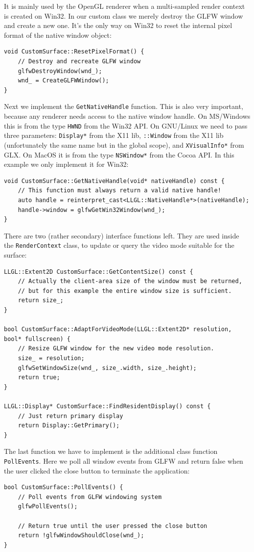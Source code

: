 \documentclass{article}
\begin{document}
It is mainly used by the OpenGL renderer when a multi-sampled render context is created on Win32.
In our custom class we merely destroy the GLFW window and create a new one.
It's the only way on Win32 to reset the internal pixel format of the native window object:
\begin{lstlisting}
void CustomSurface::ResetPixelFormat() {
	// Destroy and recreate GLFW window
	glfwDestroyWindow(wnd_);
	wnd_ = CreateGLFWWindow();
}
\end{lstlisting}
Next we implement the \texttt{GetNativeHandle} function. This is also very important,
because any renderer needs access to the native window handle.
On MS/Windows this is from the type \texttt{HWND} from the Win32 API.
On GNU/Linux we need to pass three parameters: \texttt{Display*} from the X11 lib,
\texttt{::Window} from the X11 lib (unfortunately the same name but in the global scope),
and \texttt{XVisualInfo*} from GLX.
On MacOS it is from the type \texttt{NSWindow*} from the Cocoa API.
In this example we only implement it for Win32:
\begin{lstlisting}
void CustomSurface::GetNativeHandle(void* nativeHandle) const {
	// This function must always return a valid native handle!
	auto handle = reinterpret_cast<LLGL::NativeHandle*>(nativeHandle);
	handle->window = glfwGetWin32Window(wnd_);
}
\end{lstlisting}
There are two (rather secondary) interface functions left.
They are used inside the \texttt{RenderContext} class, to update or query the video mode suitable for the surface:
\begin{lstlisting}
LLGL::Extent2D CustomSurface::GetContentSize() const {
	// Actually the client-area size of the window must be returned,
	// but for this example the entire window size is sufficient.
	return size_;
}

bool CustomSurface::AdaptForVideoMode(LLGL::Extent2D* resolution, bool* fullscreen) {
	// Resize GLFW window for the new video mode resolution.
	size_ = resolution;
	glfwSetWindowSize(wnd_, size_.width, size_.height);
	return true;
}

LLGL::Display* CustomSurface::FindResidentDisplay() const {
	// Just return primary display
	return Display::GetPrimary();
}
\end{lstlisting}
The last function we have to implement is the additional class function \texttt{PollEvents}.
Here we poll all window events from GLFW and return false when the user
clicked the close button to terminate the application:
\begin{lstlisting}
bool CustomSurface::PollEvents() {
	// Poll events from GLFW windowing system
	glfwPollEvents();

	// Return true until the user pressed the close button
	return !glfwWindowShouldClose(wnd_);
}
\end{lstlisting}
\end{document}
